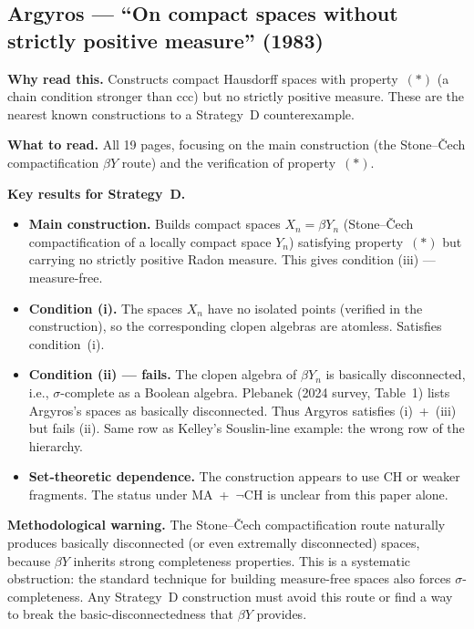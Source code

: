 \subsection*{Argyros --- ``On compact spaces without strictly
  positive measure'' (1983)}

\textbf{Why read this.}  Constructs compact Hausdorff spaces with
property~$(*)$ (a chain condition stronger than ccc) but no strictly
positive measure.  These are the nearest known constructions to a
Strategy~D counterexample.

\medskip\noindent
\textbf{What to read.}  All 19 pages, focusing on the main
construction (the Stone--\v{C}ech compactification $\beta Y$
route) and the verification of property~$(*)$.

\medskip\noindent
\textbf{Key results for Strategy~D.}

\begin{itemize}[nosep]
  \item \textbf{Main construction.}  Builds compact spaces
    $X_n = \beta Y_n$ (Stone--\v{C}ech compactification of a
    locally compact space $Y_n$) satisfying property~$(*)$ but
    carrying no strictly positive Radon measure.  This gives
    condition (iii) --- measure-free.

  \item \textbf{Condition (i).}  The spaces $X_n$ have no isolated
    points (verified in the construction), so the corresponding
    clopen algebras are atomless.  Satisfies condition~(i).

  \item \textbf{Condition (ii) --- fails.}  The clopen algebra of
    $\beta Y_n$ is basically disconnected, i.e., $\sigma$-complete
    as a Boolean algebra.  Plebanek (2024 survey, Table~1) lists
    Argyros's spaces as basically disconnected.  Thus Argyros
    satisfies (i)~+~(iii) but fails (ii).  Same row as Kelley's
    Souslin-line example: the wrong row of the hierarchy.

  \item \textbf{Set-theoretic dependence.}  The construction
    appears to use CH or weaker fragments.  The status under
    MA~+~$\neg$CH is unclear from this paper alone.
\end{itemize}

\medskip\noindent
\textbf{Methodological warning.}  The Stone--\v{C}ech
compactification route naturally produces basically disconnected
(or even extremally disconnected) spaces, because $\beta Y$ inherits
strong completeness properties.  This is a systematic obstruction:
the standard technique for building measure-free spaces also
forces $\sigma$-completeness.  Any Strategy~D construction must
avoid this route or find a way to break the basic-disconnectedness
that $\beta Y$ provides.

